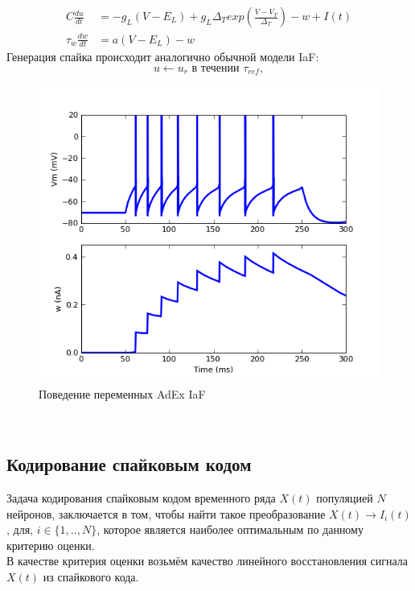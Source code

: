 \documentclass[a4paper,10pt,usenames]{article}
\begin{document}
\begin{align}
C\frac{du}{dt} &= -g_{L}(V-E_{L}) + g_{L}\Delta_{T}exp\left(\frac{V-V_{T}}{\Delta_{T}}\right)-w+I(t) \nonumber\\
\tau_{w}\frac{dw}{dt}&=a(V-E_{L})-w
\end{align}
Генерация спайка происходит аналогично обычной модели IaF:
   \begin{equation}\label{eq:iaf_reset}
   u \leftarrow u_{r} \mbox{ в течении }\tau_{ref}, 
   \end{equation}
\begin{figure}[ht]
\centering
\captionsetup{justification=centering,margin=1cm}
\includegraphics[width=120mm,scale=1]{AdExRS.png}
\caption{Поведение переменных AdEx IaF}
\label{adex_iaf_neuron_pic}
\end{figure}\\
\subsection{Кодирование спайковым кодом}
\indent Задача кодирования спайковым кодом временного ряда $X(t)$ популяцией $N$ нейронов, заключается в том, чтобы найти такое преобразование $X(t)\rightarrow I_{i}(t)$, для, $i\in\{1,..,N\}$, которое является наиболее оптимальным по данному критерию оценки.\\
\indent В качестве критерия оценки возьмём качество линейного восстановления сигнала $X(t)$ из спайкового кода.	
\end{document}
